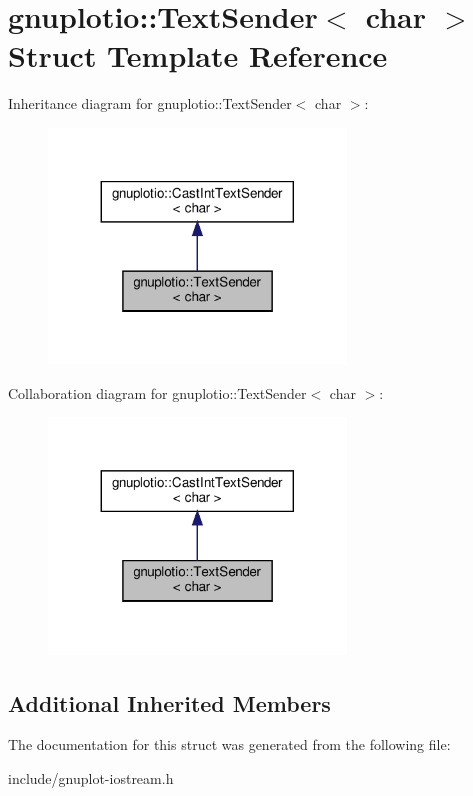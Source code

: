 \hypertarget{structgnuplotio_1_1TextSender_3_01char_01_4}{}\section{gnuplotio\+:\+:Text\+Sender$<$ char $>$ Struct Template Reference}
\label{structgnuplotio_1_1TextSender_3_01char_01_4}


Inheritance diagram for gnuplotio\+:\+:Text\+Sender$<$ char $>$\+:\nopagebreak
\begin{figure}[H]
\begin{center}
\leavevmode
\includegraphics[width=224pt]{structgnuplotio_1_1TextSender_3_01char_01_4__inherit__graph}
\end{center}
\end{figure}


Collaboration diagram for gnuplotio\+:\+:Text\+Sender$<$ char $>$\+:\nopagebreak
\begin{figure}[H]
\begin{center}
\leavevmode
\includegraphics[width=224pt]{structgnuplotio_1_1TextSender_3_01char_01_4__coll__graph}
\end{center}
\end{figure}
\subsection*{Additional Inherited Members}


The documentation for this struct was generated from the following file\+:\begin{DoxyCompactItemize}
\item 
include/gnuplot-\/iostream.\+h\end{DoxyCompactItemize}
